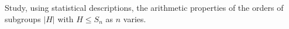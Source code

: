 Study, using statistical descriptions, the arithmetic properties of the orders of subgroups $|H|$ with $H\leq S_n$ as $n$ varies.
